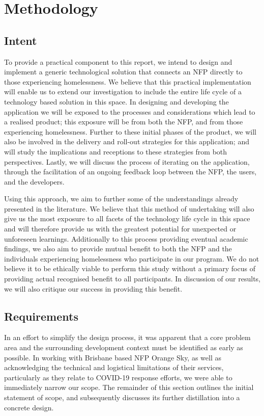 \chapter{Methodology}

\section{Intent}

To provide a practical component to this report, we intend to design and implement a generic technological solution that connects an NFP directly to those experiencing homelessness. We believe that this practical implementation will enable us to extend our investigation to include the entire life cycle of a technology based solution in this space. In designing and developing the application we will be exposed to the processes and considerations which lead to a realised product; this exposure will be from both the NFP, and from those experiencing homelessness. Further to these initial phases of the product, we will also be involved in the delivery and roll-out strategies for this application; and will study the implications and receptions to these strategies from both perspectives. Lastly, we will discuss the process of iterating on the application, through the facilitation of an ongoing feedback loop between the NFP, the users, and the developers.

Using this approach, we aim to further some of the understandings already presented in the literature. We believe that this method of undertaking will also give us the most exposure to all facets of the technology life cycle in this space and will therefore provide us with the greatest potential for unexpected or unforeseen learnings. Additionally to this process providing eventual academic findings, we also aim to provide mutual benefit to both the NFP and the individuals experiencing homelessness who participate in our program. We do not believe it to be ethically viable to perform this study without a primary focus of providing actual recognised benefit to all participants. In discussion of our results, we will also critique our success in providing this benefit.

\section{Requirements}

In an effort to simplify the design process, it was apparent that a core problem area and the surrounding development context must be identified as early as possible. In working with Brisbane based NFP Orange Sky, as well as acknowledging the technical and logistical limitations of their services, particularly as they relate to COVID-19 response efforts, we were able to immediately narrow our scope. The remainder of this section outlines the initial statement of scope, and subsequently discusses its further distillation into a concrete design.


